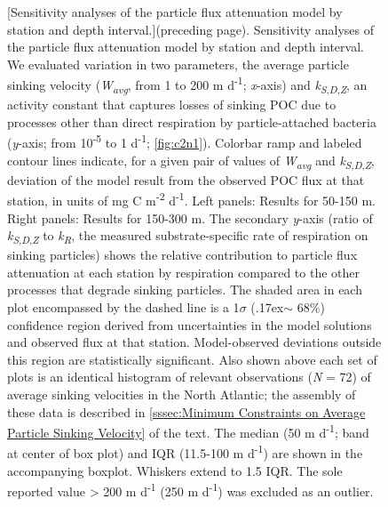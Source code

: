 \begin{figure} [!t]
[Sensitivity analyses of the particle flux attenuation model by station and depth interval.]{(preceding page). Sensitivity analyses of the particle flux attenuation model by station and depth interval. We evaluated variation in two parameters, the average particle sinking velocity (\emph{W\textsubscript{avg}}, from 1 to 200 m d\textsuperscript{-1}; \emph{x}-axis) and \emph{k\textsubscript{S}}\textsubscript{,\emph{D},\emph{Z}}, an activity constant that captures losses of sinking POC due to processes other than direct respiration by particle-attached bacteria (\emph{y}-axis; from 10\textsuperscript{-5} to 1 d\textsuperscript{-1}; \autoref{fig:c2n1}). Colorbar ramp and labeled contour lines indicate, for a given pair of values of \emph{W\textsubscript{avg}} and \emph{k\textsubscript{S}}\textsubscript{,\emph{D},\emph{Z}}, deviation of the model result from the observed POC flux at that station, in units of mg C m\textsuperscript{-2} d\textsuperscript{-1}. Left panels: Results for 50-150 m. Right panels: Results for 150-300 m. The secondary \emph{y}-axis (ratio of \emph{k\textsubscript{S}}\textsubscript{,\emph{D},\emph{Z}} to \emph{k\textsubscript{R}}, the measured substrate-specific rate of respiration on sinking particles) shows the relative contribution to particle flux attenuation at each station by respiration compared to the other processes that degrade sinking particles. The shaded area in each plot encompassed by the dashed line is a 1$\sigma$ ({\raise.17ex\hbox{$\scriptstyle\sim$}} 68\%) confidence region derived from uncertainties in the model solutions and observed flux at that station. Model-observed deviations outside this region are statistically significant. Also shown above each set of plots is an identical histogram of relevant observations (\emph{N} = 72) of average sinking velocities in the North Atlantic; the assembly of these data is described in \autoref{sssec:Minimum Constraints on Average Particle Sinking Velocity} of the text. The median (50 m d\textsuperscript{-1}; band at center of box plot) and IQR (11.5-100 m d\textsuperscript{-1}) are shown in the accompanying boxplot. Whiskers extend to 1.5 IQR. The sole reported value \textgreater{} 200 m d\textsuperscript{-1} (250 m d\textsuperscript{-1}) was excluded as an outlier.}
\label{fig:c2n5}
\end{figure}


